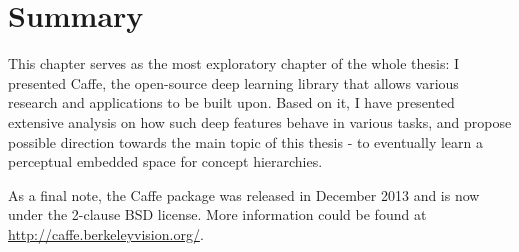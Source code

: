 \section{Summary}
This chapter serves as the most exploratory chapter of the whole thesis: I presented Caffe, the open-source deep learning library that allows various research and applications to be built upon. Based on it, I have presented extensive analysis on how such deep features behave in various tasks, and propose possible direction towards the main topic of this thesis - to eventually learn a perceptual embedded space for concept hierarchies.

As a final note, the Caffe package was released in December 2013 and is now under the 2-clause BSD license. More information could be found at \url{http://caffe.berkeleyvision.org/}.

